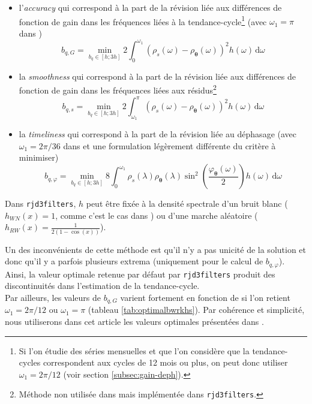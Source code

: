 \documentclass[
  12pt,
  a4paper,french]{article}
\newcommand\1{\mathds{1}}
\newcommand\ud{\,\mathrm{d}}
\begin{document}
\begin{itemize}
\item
  l'\emph{accuracy} qui correspond à la part de la révision liée aux différences de fonction de gain dans les fréquences liées à la tendance-cycle\footnote{
    Si l'on étudie des séries mensuelles et que l'on considère que la tendance-cycles correspondent aux cycles de 12 mois ou plus, on peut donc utiliser \(\omega_1=2\pi/12\) (voir section \ref{subsec:gain-deph}).} (avec \(\omega_1=\pi\) dans \textcite{dagumbianconcini2015new})
  \[
  b_{q,G}=\underset{b_q\in[h; 3h]}{\min}
  2\int_{0}^{\omega_1}
  \left(\rho_s(\omega)-\rho_{\boldsymbol\theta}(\omega)\right)^{2} h(\omega)\ud \omega
  \]
\item
  la \emph{smoothness} qui correspond à la part de la révision liée aux différences de fonction de gain dans les fréquences liées aux résidus\footnote{
    Méthode non utilisée dans \textcite{dagumbianconcini2015new} mais implémentée dans \texttt{rjd3filters}.}
  \[
  b_{q,s}=\underset{b_q\in[h; 3h]}{\min}
  2\int_{\omega_1}^{\pi}
  \left(\rho_s(\omega)-\rho_{\boldsymbol\theta}(\omega)\right)^{2} h(\omega)\ud \omega
  \]
\item
  la \emph{timeliness} qui correspond à la part de la révision liée au déphasage (avec \(\omega_1=2\pi/36\) dans \textcite{dagumbianconcini2015new} et une formulation légèrement différente du critère à minimiser)
  \[
  b_{q,\varphi}=\underset{b_q\in[h; 3h]}{\min}
  8\int_{0}^{\omega_1}
  \rho_s(\lambda)\rho_{\boldsymbol\theta}(\lambda)\sin^{2}\left(\frac{\varphi_{\boldsymbol\theta}(\omega)}{2}\right)h(\omega)\ud \omega
  \]
\end{itemize}

Dans \texttt{rjd3filters}, \(h\) peut être fixée à la densité spectrale d'un bruit blanc (\(h_{WN}(x)=1\), comme c'est le cas dans \textcite{dagumbianconcini2015new}) ou d'une marche aléatoire (\(h_{RW}(x)=\frac{1}{2(1-\cos(x))}\)).

Un des inconvénients de cette méthode est qu'il n'y a pas unicité de la solution et donc qu'il y a parfois plusieurs extrema (uniquement pour le calcul de \(b_{q,\varphi}\)).
Ainsi, la valeur optimale retenue par défaut par \texttt{rjd3filters} produit des discontinuités dans l'estimation de la tendance-cycle.\\
Par ailleurs, les valeurs de \(b_{q,G}\) varient fortement en fonction de si l'on retient \(\omega_1=2\pi/12\) ou \(\omega_1=\pi\) (tableau \ref{tab:optimalbwrkhs}).
Par cohérence et simplicité, nous utiliserons dans cet article les valeurs optimales présentées dans \textcite{dagumbianconcini2015new}.
\end{document}
